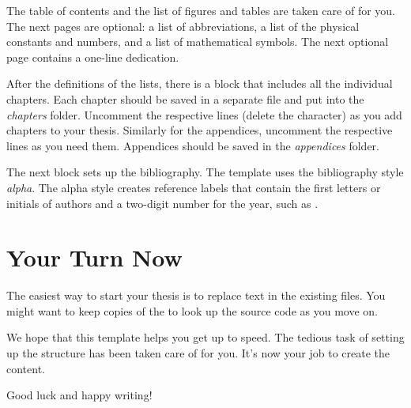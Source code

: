 The table of contents and the list of figures and tables are taken care of for you.%
The next pages are optional: a list of abbreviations, a list of the physical constants and numbers, and a list of mathematical symbols.
The next optional page contains a one-line dedication.

After the definitions of the lists, there is a block that includes all the individual chapters. Each chapter should be saved in a separate file and put into the \emph{chapters} folder.
Uncomment the respective lines (delete the \code{\%} character) as you add chapters to your thesis. Similarly for the appendices, uncomment the respective lines as you need them. Appendices should be saved in the \emph{appendices} folder.

The next block sets up the bibliography. The template uses the bibliography style \emph{alpha}. The alpha style creates reference labels that contain the first letters or initials of authors and a two-digit number for the year, such as \cite{Hintz02}.


\section{Your Turn Now}

The easiest way to start your thesis is to replace text in the existing files. You might want to keep copies of the  to look up the source code as you move on.

We hope that this template helps you get up to speed. The tedious task of setting up the structure has been taken care of for you. It's now your job to create the content.

Good luck and happy writing!

